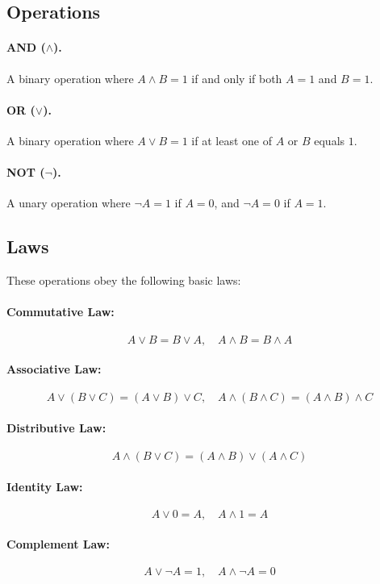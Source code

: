\subsection{Operations}
\paragraph{AND (\( \land \)).} A binary operation where \( A \land B = 1 \) if and only if both \( A = 1 \) and \( B = 1 \).
\paragraph{ OR (\( \lor \)).}  A binary operation where \( A \lor B = 1 \) if at least one of \( A \) or \( B \) equals \( 1 \).

\paragraph{NOT (\( \neg \)).} A unary operation where \( \neg A = 1 \) if \( A = 0 \), and \( \neg A = 0 \) if \( A = 1 \).

\subsection{Laws}
These operations obey the following basic laws:
\paragraph{Commutative Law:} 
\[
A \lor B = B \lor A, \quad A \land B = B \land A
\]

\paragraph{Associative Law:} 
\[
A \lor (B \lor C) = (A \lor B) \lor C, \quad A \land (B \land C) = (A \land B) \land C
\]

\paragraph{Distributive Law:} 
\[
A \land (B \lor C) = (A \land B) \lor (A \land C)
\]

\paragraph{Identity Law:} 
\[
A \lor 0 = A, \quad A \land 1 = A
\]

\paragraph{Complement Law:} 
\[
A \lor \neg A = 1, \quad A \land \neg A = 0
\]

